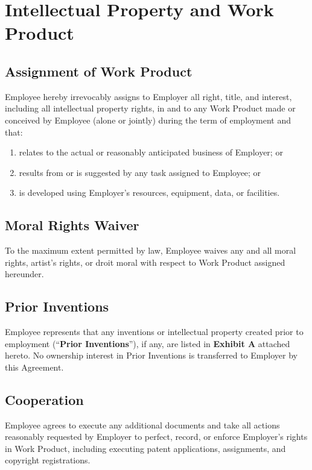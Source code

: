 \documentclass[11pt,a4paper]{article}
\begin{document}
\section{Intellectual Property and Work Product}

\subsection{Assignment of Work Product}
\noindent
Employee hereby irrevocably assigns to Employer all right, title, and interest,
including all intellectual property rights, in and to any Work Product made or conceived
by Employee (alone or jointly) during the term of employment and that:

\begin{enumerate}[label=(\alph*), leftmargin=2em, itemsep=2pt]
  \item relates to the actual or reasonably anticipated business of Employer; or
  \item results from or is suggested by any task assigned to Employee; or
  \item is developed using Employer's resources, equipment, data, or facilities.
\end{enumerate}

\subsection{Moral Rights Waiver}
\noindent
To the maximum extent permitted by law, Employee waives any and all moral rights, artist's
rights, or droit moral with respect to Work Product assigned hereunder.

\subsection{Prior Inventions}
\noindent
Employee represents that any inventions or intellectual property created prior to employment
(``\textbf{Prior Inventions}''), if any, are listed in \textbf{Exhibit A} attached hereto.
No ownership interest in Prior Inventions is transferred to Employer by this Agreement.

\subsection{Cooperation}
\noindent
Employee agrees to execute any additional documents and take all actions reasonably requested
by Employer to perfect, record, or enforce Employer's rights in Work Product, including
executing patent applications, assignments, and copyright registrations.
\end{document}
